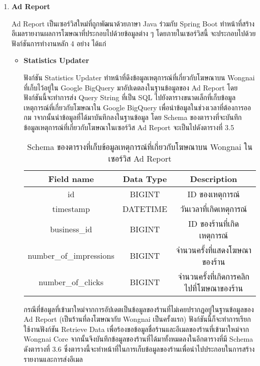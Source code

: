 \begin{enumerate}
	\item \textbf{Ad Report}
	
	Ad Report เป็นเซอร์วิสใหม่ที่ถูกพัฒนาด้วยภาษา Java ร่วมกับ Spring Boot ทำหน้าที่สร้างอีเมลรายงานผลการโฆษณาที่ประกอบไปด้วยข้อมูลต่าง ๆ โดยภายในเซอร์วิสนี้ จะประกอบไปด้วยฟังก์ชันการทำงานหลัก 4 อย่าง ได้แก่
	\begin{itemize}
		\item \textbf{Statistics Updater}
		
		ฟังก์ชัน Statistics Updater ทำหน้าที่ดึงข้อมูลเหตุการณ์ที่เกี่ยวกับโฆษณาบน Wongnai ที่เก็บไว้อยู่ใน Google BigQuery มาอัปเดตลงในฐานข้อมูลของ Ad Report โดยฟังก์ชันนี้จะทำการส่ง Query String ที่เป็น SQL ไปยังตารางขนาดเล็กที่เก็บข้อมูลเหตุการณ์ที่เกี่ยวกับโฆษณาใน Google BigQuery เพื่อนำข้อมูลในช่วงเวลาที่ต้องการออกม าจากนั้นนำข้อมูลที่ได้มาบันทึกลงในฐานข้อมูล โดย Schema ของตารางที่จะบันทึกข้อมูลเหตุการณ์ที่เกี่ยวกับโฆษณาในเซอร์วิส Ad Report จะเป็นไปดังตารางที่ 3.5
		
		\begin{table}[!h]
			\centering
			\begin{tabular}{|c|c|c|}
				\hline
				\textbf{Field name} & \textbf{Data Type} & \textbf{Description} \\ \hline
				id & BIGINT & ID ของเหตุการณ์ \\ \hline
				timestamp & DATETIME & วันเวลาที่เกิดเหตุการณ์ \\ \hline
				business\_id & BIGINT & ID ของร้านที่เกิดเหตุการณ์ \\ \hline
				number\_of\_impressions & BIGINT & จำนวนครั้งที่แสดงโฆษณาของร้าน \\ \hline
				number\_of\_clicks & BIGINT & จำนวนครั้งที่เกิดการคลิกไปที่โฆษณาของร้าน \\ \hline
			\end{tabular}
			\caption{Schema ของตารางที่เก็บข้อมูลเหตุการณ์ที่เกี่ยวกับโฆษณาบน Wongnai ในเซอร์วิส Ad Report}
			\label{Table:schema-ad-report-1}
		\end{table}
		
		กรณีที่ข้อมูลที่เข้ามาใหม่จากการอัปเดตเป็นข้อมูลของร้านที่ไม่เคยปรากฏอยู่ในฐานข้อมูลของ Ad Report (เป็นร้านที่ลงโฆษณากับ Wongnai เป็นครั้งแรก) ฟังก์ชันนี้ก็จะทำการเรียกใช้งานฟังก์ชัน Retrieve Data เพื่อร้องขอข้อมูลชื่อร้านและอีเมลของร้านที่เข้ามาใหม่จาก Wongnai Core จากนั้นจึงบันทึกข้อมูลของร้านที่ได้มาทั้งหมดลงในอีกตารางที่มี Schema ดังตารางที่ 3.6 ซึ่งตารางนี้จะทำหน้าที่ในการเก็บข้อมูลของร้านเพื่อนำไปประกอบในการสร้างรายงานและการส่งอีเมล 
		

\end{itemize}
\end{enumerate}
